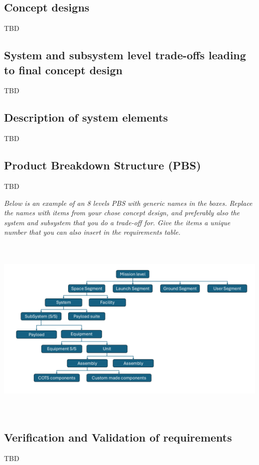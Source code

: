 \documentclass[../main.tex]{subfiles}
\begin{document}
\subsection{Concept designs}\label{concept-designs}

TBD

\subsection{System and subsystem level trade-offs leading to final
concept
design}\label{trade-offs}

TBD

\subsection{Description of system
elements}\label{description-of-system-elements}

TBD

\subsection{Product Breakdown Structure
(PBS)}\label{pbs}

TBD

\emph{Below is an example of an 8 levels PBS with generic names in the
boxes. Replace the names with items from your chose concept design, and
preferably also the system and subsystem that you do a trade-off for.
Give the items a unique number that you can also insert in the
requirements table.}

\includegraphics[width=6.28264in,height=3.53403in]{media/Product Breakdown Structure.png}

\subsection{Verification and Validation of
requirements}\label{verification-and-validation}

TBD
\end{document}
